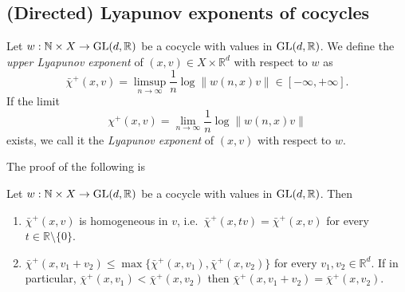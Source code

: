 \documentclass{report}
\begin{document}
\subsection{(Directed) Lyapunov exponents of cocycles}
\begin{definition}
    Let $w: \mathbb N \times X \to \operatorname{{\mathrm{GL}}}(d, \mathbb R)$ be a cocycle with values in $\operatorname{{\mathrm{GL}}}(d,\mathbb R)$.
    We define the \emph{upper Lyapunov exponent} of $(x, v) \in X \times \mathbb R^d$ with respect to $w$ as
    \[
    \bar \chi^+ (x, v) = \limsup_{n \to \infty} \frac{1}{n} \log \|w(n,x) v\| \in [- \infty, +\infty].
    \]
    If the limit
    \[
    \chi^+(x,v) = \lim_{n \to \infty} \frac{1}{n} \log \|w(n,x) v\|
    \]
    exists, we call it the \emph{Lyapunov exponent} of $(x,v)$ with respect to $w$.
\end{definition}
The proof of the following is \cite[Lemma S.2.6]{katok1995introduction}
\begin{lemma}
    Let $w: \mathbb N \times X \to \operatorname{{\mathrm{GL}}}(d, \mathbb R)$ be a cocycle with values in $\operatorname{{\mathrm{GL}}}(d,\mathbb R)$.
    Then
    \begin{enumerate}[label=(\roman*)]
        \item $\bar \chi^+(x, v)$ is homogeneous in $v$, i.e.\ $\bar \chi^+(x, t v) = \bar \chi^+(x, v)$ for every $t \in \mathbb R \setminus \{0\}$.
        \item $\bar \chi^+(x, v_1 + v_2) \leq \max\{\bar \chi^+(x, v_1), \bar \chi^+(x, v_2)\}$ for every $v_1, v_2 \in \mathbb R^d$.
        If in particular, $\bar \chi^+(x, v_1) < \bar \chi^+(x, v_2)$ then $\bar \chi^+(x, v_1 + v_2) = \bar \chi^+(x, v_2)$.
    \end{enumerate}
\end{lemma}
\end{document}
